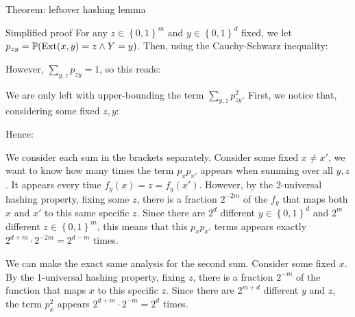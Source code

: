 \documentclass[a4paper]{article}
\begin{document}
\begin{parag}{Theorem: leftover hashing lemma}
\begin{subparag}{Simplified proof}
        For any $z \in \left\{0, 1\right\}^m$ and $y \in \left\{0, 1\right\}^d$ fixed, we let $p_{zy} = \prob\left(\text{Ext}\left(x, y\right) = z \land Y = y\right)$. Then, using the Cauchy-Schwarz inequality: 

        However, $\sum_{y, z} p_{zy} = 1$, so this reads: 


        We are only left with upper-bounding the term $\sum_{y, z} p_{zy}^2$. First, we notice that, considering some fixed $z, y$:

        Hence:

        We consider each sum in the brackets separately. Consider some fixed $x \neq x'$, we want to know how many times the term $p_x p_{x'}$ appears when summing over all $y, z$. It appears every time $f_y\left(x\right) = z = f_y\left(x'\right)$. However, by the 2-universal hashing property, fixing some $z$, there is a fraction $2^{-2m}$ of the $f_y$ that maps both $x$ and $x'$ to this same specific $z$. Since there are $2^d$ different $y \in \left\{0, 1\right\}^d$ and $2^m$ different $z \in \left\{0, 1\right\}^m$, this means that this $p_x p_{x'}$ terms appears exactly $2^{d + m} \cdot 2^{-2m} = 2^{d -m}$ times.

        We can make the exact same analysis for the second sum. Consider some fixed $x$. By the 1-universal hashing property, fixing $z$, there is a fraction $2^{-m}$ of the function that maps $x$ to this specific $z$. Since there are $2^{m + d}$ different $y$ and $z$, the term $p_x^2$ appears $2^{d + m}\cdot 2^{-m} = 2^d$ times.


\end{subparag}
\end{parag}
\end{document}
